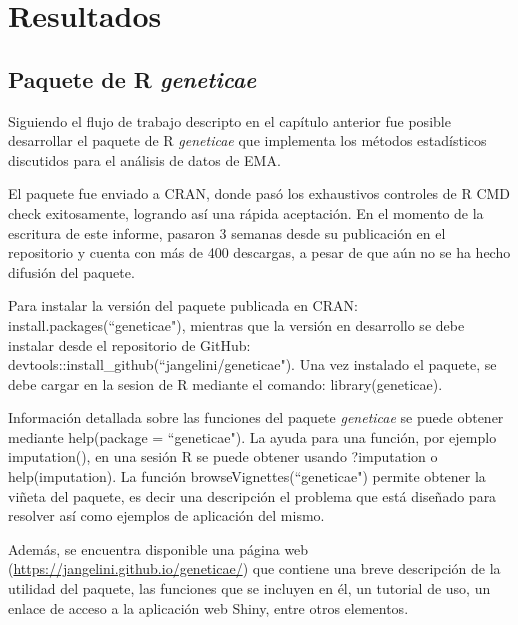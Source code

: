 

\chapter{Resultados}


\section{Paquete de R \emph{geneticae}}

Siguiendo el flujo de trabajo descripto en el capítulo anterior fue posible desarrollar el paquete de R \emph{geneticae} que implementa los métodos estadísticos discutidos para el análisis de datos de EMA.

El paquete fue enviado a CRAN, donde pasó los exhaustivos controles de R CMD check exitosamente, logrando así una rápida aceptación. En el momento de la escritura de este informe, pasaron 3 semanas desde su publicación en el repositorio y cuenta con más de 400 descargas, a pesar de que aún no se ha hecho difusión del paquete. 

Para instalar la versión del paquete publicada en CRAN:  \textcolor{fandango}{install.packages(``geneticae")}, mientras que la versión en desarrollo se debe instalar desde el repositorio de GitHub:  \textcolor{fandango}{devtools::install\_github(``jangelini/geneticae")}. Una vez instalado el paquete, se debe cargar en la sesion de R mediante el comando: \textcolor{fandango}{library(geneticae)}. 

Información detallada sobre las funciones del paquete \emph{geneticae} se puede obtener mediante \textcolor{fandango}{help(package = ``geneticae")}. La ayuda para una función, por ejemplo \textcolor{fandango}{imputation()}, en una sesión R se puede obtener usando \textcolor{fandango}{?imputation} o \textcolor{fandango}{help(imputation)}. La función \textcolor{fandango}{browseVignettes(``geneticae")} permite obtener la viñeta del paquete, es decir una descripción el problema que está diseñado para resolver así como ejemplos de aplicación del mismo. 

Además, se encuentra disponible una página web (\url{https://jangelini.github.io/geneticae/}) que contiene una breve descripción de la utilidad del paquete, las funciones que se incluyen en él, un tutorial de uso, un enlace de acceso a la aplicación web Shiny, entre otros elementos.


